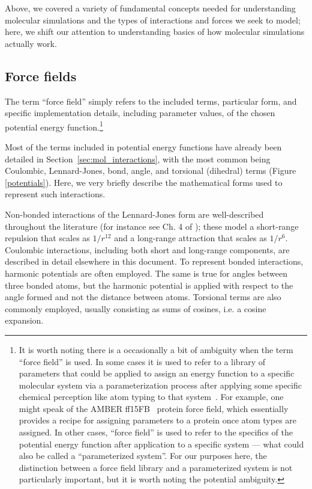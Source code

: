 \documentclass[9pt,bestpractices]{livecoms}
\begin{document}
Above, we covered a variety of fundamental concepts needed for understanding molecular simulations and the types of interactions and forces we seek to model; here, we shift our attention to understanding basics of how molecular simulations actually work.

\subsection{Force fields}
\label{sec:force_fields}

The term ``force field'' simply refers to the included terms, particular form, and specific implementation details, including parameter values, of the chosen potential energy function.\footnote{It is worth noting there is a occasionally a bit of ambiguity when the term ``force field'' is used.
In some cases it is used to refer to a library of parameters that could be applied to assign an energy function to a specific molecular system via a parameterization process after applying some specific chemical perception like atom typing to that system~\cite{Mobley:2018:bioRxiv}.
For example, one might speak of the AMBER ff15FB~\citep{amber15FB} protein force field, which essentially provides a recipe for assigning parameters to a protein once atom types are assigned.
In other cases, ``force field'' is used to refer to the specifics of the potential energy function after application to a specific system --- what could also be called a ``parameterized system''.
For our purposes here, the distinction between a force field library and a parameterized system is not particularly important, but it is worth noting the potential ambiguity. }

Most of the terms included in potential energy functions have already been detailed in Section~\ref{sec:mol_interactions}, with the most common being Coulombic, Lennard-Jones, bond, angle, and torsional (dihedral) terms (Figure \ref{potentials}).
Here, we very briefly describe the mathematical forms used to represent such interactions.

Non-bonded interactions of the Lennard-Jones form are well-described throughout the literature (for instance see Ch. 4 of \citet{LeachBook}); these model a short-range repulsion that scales as $1/r^{12}$ and a long-range attraction that scales as $1/r^6$.
Coulombic interactions, including both short and long-range components, are described in detail elsewhere in this document.
To represent bonded interactions, harmonic potentials are often employed.
The same is true for angles between three bonded atoms, but the harmonic potential is applied with respect to the angle formed and not the distance between atoms.
Torsional terms are also commonly employed, usually consisting as sums of cosines, i.e. a cosine expansion.
\end{document}
